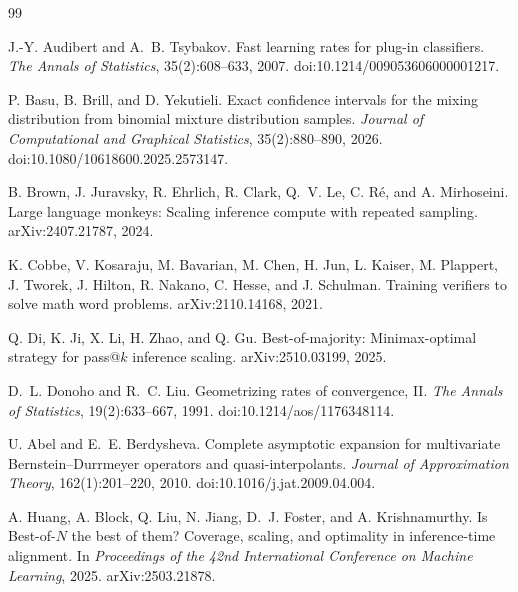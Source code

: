 \documentclass[11pt]{article}
\begin{document}
\begin{thebibliography}{99}

J.-Y. Audibert and A.~B. Tsybakov.
\newblock Fast learning rates for plug-in classifiers.
\newblock \emph{The Annals of Statistics}, 35(2):608--633, 2007.
\newblock doi:10.1214/009053606000001217.

P. Basu, B. Brill, and D. Yekutieli.
\newblock Exact confidence intervals for the mixing distribution from binomial mixture distribution samples.
\newblock \emph{Journal of Computational and Graphical Statistics}, 35(2):880--890, 2026.
\newblock doi:10.1080/10618600.2025.2573147.

B. Brown, J. Juravsky, R. Ehrlich, R. Clark, Q.~V. Le, C. R\'e, and A. Mirhoseini.
\newblock Large language monkeys: Scaling inference compute with repeated sampling.
\newblock arXiv:2407.21787, 2024.

K. Cobbe, V. Kosaraju, M. Bavarian, M. Chen, H. Jun, L. Kaiser, M. Plappert, J. Tworek, J. Hilton, R. Nakano, C. Hesse, and J. Schulman.
\newblock Training verifiers to solve math word problems.
\newblock arXiv:2110.14168, 2021.

Q. Di, K. Ji, X. Li, H. Zhao, and Q. Gu.
\newblock Best-of-majority: Minimax-optimal strategy for pass@$k$ inference scaling.
\newblock arXiv:2510.03199, 2025.

D.~L. Donoho and R.~C. Liu.
\newblock Geometrizing rates of convergence, II.
\newblock \emph{The Annals of Statistics}, 19(2):633--667, 1991.
\newblock doi:10.1214/aos/1176348114.

U. Abel and E.~E. Berdysheva.
\newblock Complete asymptotic expansion for multivariate Bernstein--Durrmeyer operators and quasi-interpolants.
\newblock \emph{Journal of Approximation Theory}, 162(1):201--220, 2010.
\newblock doi:10.1016/j.jat.2009.04.004.

A. Huang, A. Block, Q. Liu, N. Jiang, D.~J. Foster, and A. Krishnamurthy.
\newblock Is Best-of-$N$ the best of them? Coverage, scaling, and optimality in inference-time alignment.
\newblock In \emph{Proceedings of the 42nd International Conference on Machine Learning}, 2025.
\newblock arXiv:2503.21878.


\end{thebibliography}
\end{document}
